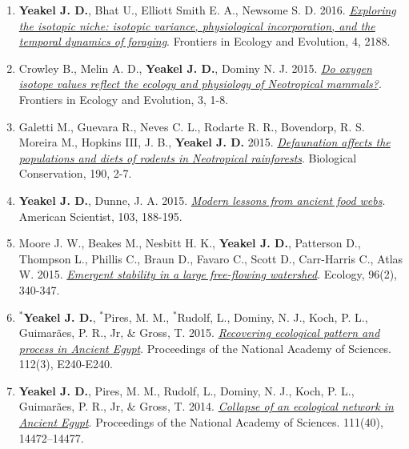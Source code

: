\documentclass[margin,line,12pt]{res}
\begin{document}
\begin{resume}
\begin{enumerate}
\item \textbf{Yeakel J. D.}, Bhat U., Elliott Smith E. A., Newsome S. D. 2016. \href{https://www.frontiersin.org/articles/10.3389/fevo.2016.00001/full}{\emph{Exploring the isotopic niche: isotopic variance, physiological incorporation, and the temporal dynamics of foraging}}. Frontiers in Ecology and Evolution, 4, 2188.

\item Crowley B., Melin A. D., \textbf{Yeakel J. D.}, Dominy N. J. 2015. \href{https://www.frontiersin.org/articles/10.3389/fevo.2015.00127/full}{\emph{Do oxygen isotope values reflect the ecology and physiology of Neotropical mammals?}}. Frontiers in Ecology and Evolution, 3, 1-8.

\item Galetti M., Guevara R., Neves C. L., Rodarte R. R., Bovendorp, R. S. Moreira M., Hopkins III, J. B., \textbf{Yeakel J. D.} 2015. \href{https://www.sciencedirect.com/science/article/abs/pii/S000632071500186X}{\emph{Defaunation affects the populations and diets of rodents in Neotropical rainforests}}. Biological Conservation, 190, 2-7.

\item \textbf{Yeakel J. D.}, Dunne, J. A. 2015. \href{https://www.americanscientist.org/article/modern-lessons-from-ancient-food-webs}{\emph{Modern lessons from ancient food webs}}. American Scientist, 103, 188-195.

\item Moore J. W., Beakes M., Nesbitt H. K., \textbf{Yeakel J. D.}, Patterson D., Thompson L., Phillis C., Braun D., Favaro C., Scott D., Carr-Harris C., Atlas W. 2015. \href{https://esajournals.onlinelibrary.wiley.com/doi/full/10.1890/14-0326.1}{\emph{Emergent stability in a large free-flowing watershed}}. Ecology, 96(2), 340-347.

\item \textbf{${}^\ast$Yeakel J. D.}, ${}^\ast$Pires, M. M., ${}^\ast$Rudolf, L., Dominy, N. J., Koch, P. L., Guimar\~aes, P. R., Jr,
\& Gross, T. 2015. \href{https://www.pnas.org/content/early/2015/01/07/1422646112}{\emph{Recovering ecological pattern and process in Ancient Egypt}}. Proceedings of the National Academy of Sciences. 112(3), E240-E240.

\item \textbf{Yeakel J. D.}, Pires, M. M., Rudolf, L., Dominy, N. J., Koch, P. L., Guimar\~aes, P. R., Jr, \& Gross, T. 2014. \href{https://www.pnas.org/content/111/40/14472}{\emph{Collapse of an ecological network in Ancient Egypt}}. Proceedings of the National Academy of Sciences. 111(40), 14472–14477.


\end{enumerate}
\end{resume}
\end{document}
